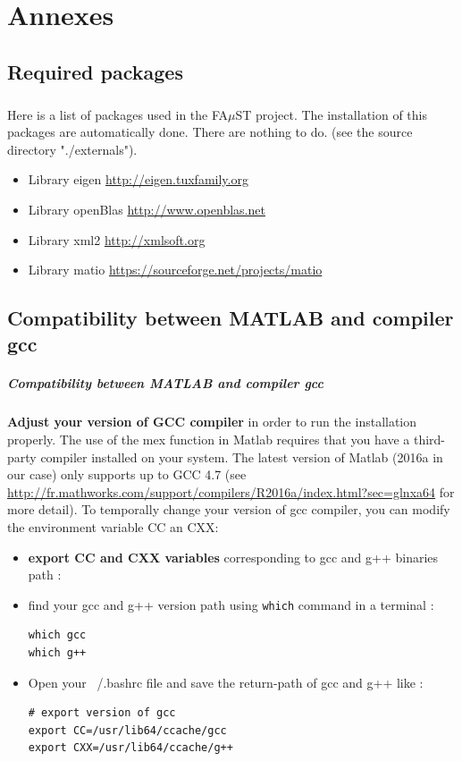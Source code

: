 \chapter{Annexes}\label{sec:Annexes}

\section{Required packages}\label{sec:ANNEXERequiredPackages}
\paragraph{}Here is a list of packages used in the FA$\mu$ST project. The installation of this packages are automatically done. There are nothing to do. (see the source directory "./externals").
\begin{itemize}
\item Library eigen \url{http://eigen.tuxfamily.org}
\item Library openBlas \url{http://www.openblas.net}
\item Library xml2 \url{http://xmlsoft.org}
\item Library matio \url{https://sourceforge.net/projects/matio}
\end{itemize}

\section{Compatibility between MATLAB and compiler gcc}\label{sec:ANNEXECompatibilityMatlabCompiler}
\paragraph{Compatibility between MATLAB and compiler gcc} \textbf{Adjust your version of GCC compiler} in order to run the installation properly. The use of the mex function in Matlab requires that you have a third-party compiler installed on your system. The latest version of Matlab (2016a in our case) only supports up to GCC 4.7 (see \url{http://fr.mathworks.com/support/compilers/R2016a/index.html?sec=glnxa64} for more detail).
To temporally change your version of gcc compiler, you can modify the environment variable CC an CXX: 
\begin{itemize}
\item \textbf{export CC and CXX variables} corresponding to gcc and g++ binaries path :\\
\item find your gcc and g++ version path using \texttt{which} command in a terminal :
\begin{lstlisting}
which gcc
which g++
\end{lstlisting}

\item Open your ~/.bashrc file and save the return-path of gcc and g++ like : \\
\begin{lstlisting}
# export version of gcc
export CC=/usr/lib64/ccache/gcc
export CXX=/usr/lib64/ccache/g++
\end{lstlisting}
\end{itemize}

